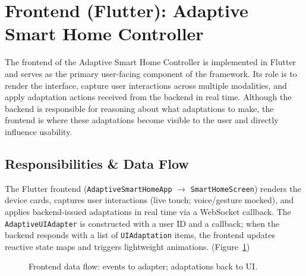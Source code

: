 \documentclass[openany]{book}
\begin{document}
\section{Frontend (Flutter): Adaptive Smart Home Controller}
The frontend of the Adaptive Smart Home Controller is implemented in Flutter and serves as the primary user-facing component of the framework. Its role is to render the interface, capture user interactions across multiple modalities, and apply adaptation actions received from the backend in real time. Although the backend is responsible for reasoning about what adaptations to make, the frontend is where these adaptations become visible to the user and directly influence usability.

\subsection{Responsibilities \& Data Flow}
The Flutter frontend (\texttt{AdaptiveSmartHomeApp} $\rightarrow$ \texttt{SmartHomeScreen}) renders the device cards, captures user interactions (live touch; voice/gesture mocked), and applies backend-issued adaptations in real time via a WebSocket callback. The \texttt{AdaptiveUIAdapter} is constructed with a user ID and a callback; when the backend responds with a list of \texttt{UIAdaptation} items, the frontend updates reactive state maps and triggers lightweight animations. (Figure~\ref{fig:frontend_data_flow})

\begin{figure}[h]
\centering
{}
\caption{Frontend data flow: events to adapter; adaptations back to UI.}
\label{fig:frontend_data_flow}
\end{figure}
\end{document}
